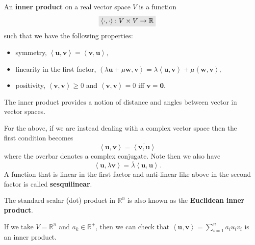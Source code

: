 \documentclass[letter-paper]{tufte-book}
\newenvironment{example}[1][Example]{\begin{trivlist}
\item[\hskip \labelsep {\bfseries #1}]}{\end{trivlist}}
\newcommand{\inner}[2]{\left\langle #1, #2\right\rangle}
\newcommand{\Ob}{{\boldsymbol{0}}}
\newcommand{\ub}{{\boldsymbol{u}}}
\newcommand{\vb}{{\boldsymbol{v}}}
\newcommand{\wb}{{\boldsymbol{w}}}
\newcommand{\highlight}[1]{\mathchoice%
  {\colorbox{black!10}{$\displaystyle#1$}}%
  {\colorbox{black!10}{$\textstyle#1$}}%
  {\colorbox{black!10}{$\scriptstyle#1$}}%
  {\colorbox{black!10}{$\scriptscriptstyle#1$}}}%
\begin{document}
An \textbf{inner product} on a real vector space $V$ is a function
\begin{equation}
  \highlight{\inner{\cdot}{\cdot} : V\times V \to \mathbb{R}}
\end{equation}
such that we have the following properties:
\begin{itemize}
  \item symmetry, $\inner{\ub}{\vb} = \inner{\vb}{\ub}$,
  \item linearity in the first factor, $\inner{\lambda\ub + \mu\wb}{\vb} = \lambda\inner{\ub}{\vb} + \mu\inner{\wb}{\vb}$,
  \item positivity, $\inner{\vb}{\vb} \geq 0$ and $\inner{\vb}{\vb} = 0$ iff $\vb = \Ob$.
\end{itemize}

The inner product provides a notion of distance and angles between vector in vector spaces.

For the above, if we are instead dealing with a complex vector space then the first condition becomes
\begin{equation*}
  \inner{\ub}{\vb} = \overline{\inner{\vb}{\ub}}
\end{equation*}
where the overbar denotes a complex conjugate. Note then we also have
\begin{equation*}
  \inner{\ub}{\lambda\vb} = \overline{\lambda}\inner{\ub}{\ub}.
\end{equation*}
A function that is linear in the first factor and anti-linear like above in the second factor is called \textbf{sesquilinear}.

\begin{example}
  The standard scalar (dot) product in $\mathbb{R}^n$ is also known as the \textbf{Euclidean inner product}.
\end{example}

\begin{example}
  If we take $V=\mathbb{R}^n$ and $a_k \in \mathbb{R}^+$, then we can check that $\inner{\ub}{\vb} = \sum_{i=1}^n a_i u_i v_i$ is an inner product.
\end{example}
\end{document}
